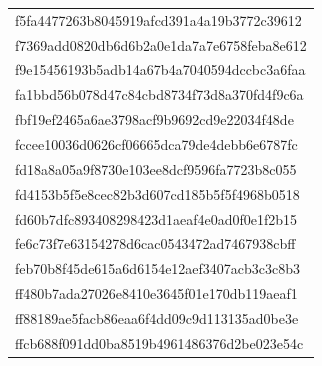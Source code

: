 \begin{tabular}{l}
f5fa4477263b8045919afcd391a4a19b3772c39612 \\
f7369add0820db6d6b2a0e1da7a7e6758feba8e612 \\
f9e15456193b5adb14a67b4a7040594dccbc3a6faa \\
fa1bbd56b078d47c84cbd8734f73d8a370fd4f9c6a \\
fbf19ef2465a6ae3798acf9b9692cd9e22034f48de \\
fccee10036d0626cf06665dca79de4debb6e6787fc \\
fd18a8a05a9f8730e103ee8dcf9596fa7723b8c055 \\
fd4153b5f5e8cec82b3d607cd185b5f5f4968b0518 \\
fd60b7dfc893408298423d1aeaf4e0ad0f0e1f2b15 \\
fe6c73f7e63154278d6cac0543472ad7467938cbff \\
feb70b8f45de615a6d6154e12aef3407acb3c3c8b3 \\
ff480b7ada27026e8410e3645f01e170db119aeaf1 \\
ff88189ae5facb86eaa6f4dd09c9d113135ad0be3e \\
ffcb688f091dd0ba8519b4961486376d2be023e54c \\
\bottomrule
\end{tabular}
